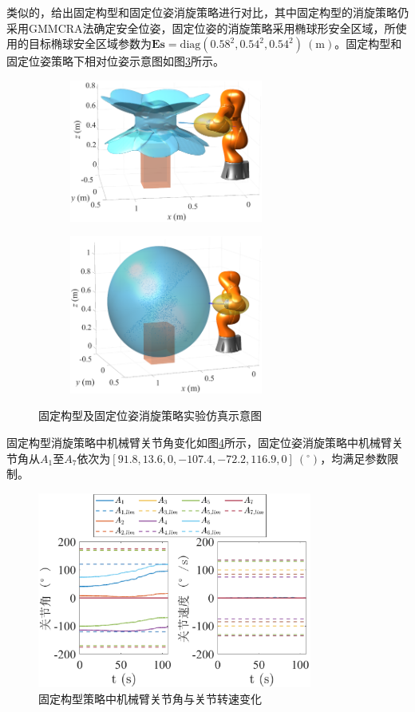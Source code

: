 \documentclass[lang=chs, degree=master, blindreview=false, winfonts=true]{yanputhesis}
\begin{document}
类似的，给出固定构型和固定位姿消旋策略进行对比，其中固定构型的消旋策略仍采用GMMCRA法确定安全位姿，固定位姿的消旋策略采用椭球形安全区域，所使用的目标椭球安全区域参数为${\boldsymbol{E}}{{\boldsymbol{s}}} = \mathrm{diag}({0.58^2},{0.54^2},{0.54^2})\ (\mathrm{m})$。固定构型和固定位姿策略下相对位姿示意图如图\ref{Fig.pose_posifix}所示。
\begin{figure}[htbp]
	\centering
	\begin{minipage}[t]{0.96\textwidth}
		\begin{subfigure}[t]{0.47\textwidth}
			\centering
			\includegraphics[width = 2.5in]{picture/posefix.eps}
			\caption{ }
			\label{fig:posefix}
		\end{subfigure}\hfill
		\begin{subfigure}[t]{0.47\textwidth}
			\centering
			\includegraphics[width = 2.5in]{picture/posifix.eps}
			\caption{ }
			\label{fig:posifix}
		\end{subfigure}
	\end{minipage}
	\caption{固定构型及固定位姿消旋策略实验仿真示意图\label{Fig.pose_posifix}}
\end{figure}


固定构型消旋策略中机械臂关节角变化如图\ref{fig:arm_angle_posefix}所示，固定位姿消旋策略中机械臂关节角从$A_{1}$至$A_{7}$依次为$[91.8,13.6,0,-107.4,-72.2,116.9,0]\ (^\circ)$，均满足参数限制。
\begin{figure}[htbp]
	\centering
	\includegraphics[width = 3.55in]{picture/arm_angle_posefix.eps}
	\caption{固定构型策略中机械臂关节角与关节转速变化}
	\label{fig:arm_angle_posefix}
\end{figure}
\end{document}
